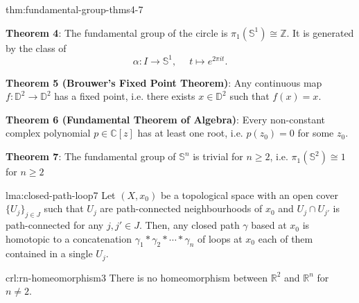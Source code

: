 \documentclass[landscape, 8pt]{extarticle}
\begin{document}
\begin{multicols*}{3}
\begin{thm}{thm:fundamental-group-thms}{4-7}
	\vspace{-2pt}
	\begin{itemize-zero}
		\item \textbf{Theorem 4}: The fundamental group of the circle is $\pi_{1}(\mathbb{S}^{1}) \cong \mathbb{Z}$. It is generated by the class of
			\[\alpha : I \to \mathbb{S}^{1},\;\quad t \mapsto e^{2\pi i t}.\]
			\par\vspace{-5pt}
	\vspace{-2pt}
		\item \textbf{Theorem 5 (Brouwer's Fixed Point Theorem)}: Any continuous map $f : \mathbb{D}^{2} \to \mathbb{D}^{2}$ has a fixed point, i.e. there exists $x \in \mathbb{D}^{2}$ such that $f(x) = x$.
	\vspace{-2pt}
		\item \textbf{Theorem 6 (Fundamental Theorem of Algebra)}: Every non-constant complex polynomial $p\in \mathbb{C}[z]$ has at least one root, i.e. $p(z_{0}) = 0$ for some $z_{0}$.
	\vspace{-2pt}
		\item \textbf{Theorem 7}: The fundamental group of $\mathbb{S}^{n}$ is trivial for $n \ge 2$, i.e. $\pi_{1}(\mathbb{S}^{2}) \cong 1$ for $n \ge 2$
	\end{itemize-zero}
\end{thm}

\vspace{-7pt}
\begin{lma}{lma:closed-path-loop}{7}
	\vspace{-2pt}
	Let $(X, x_{0})$ be a topological space with an open cover $\{U_{j}\}_{j\in J}$ such that $U_{j}$ are path-connected neighbourhoods of $x_{0}$ and $U_{j} \cap U_{j'}$ is path-connected for any $j, j' \in J$. Then, any closed path $\gamma$ based at $x_{0}$ is homotopic to a concatenation $\gamma_{1} \ast \gamma_{2} \ast \cdots \ast \gamma_{n}$ of loops at $x_{0}$ each of them contained in a single $U_{j}$.
\end{lma}

\vspace{-7pt}
\begin{crl}{crl:rn-homeomorphism}{3}
	\vspace{-2pt}
	There is no homeomorphism between $\mathbb{R}^{2}$ and $\mathbb{R}^{n}$ for $n \ne 2$.
	\vspace{-2pt}
\end{crl}


\end{multicols*}
\end{document}
